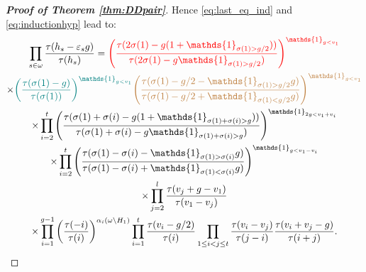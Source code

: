 \documentclass[11pt,letterpaper]{amsart}
\numberwithin{equation}{section}
\numberwithin{df}{section}
\begin{document}
\begin{proof}[\textbf{Proof of Theorem \ref{thm:DDpair}}]
Hence \eqref{eq:last_eq_ind} and \eqref{eq:inductionhyp} lead to:
\begin{multline}\label{eq:last_hope}
\prod_{s\in\omega}\frac{\tau(h_s-\varepsilon_s g)}{\tau(h_s)}=\textcolor{red}{\left(\frac{\tau(2\sigma(1)-g(1+\mathds{1}_{\sigma(1)>g/2}))}{\tau(2\sigma(1)-g\mathds{1}_{\sigma(1)>g/2})}\right)^{\mathds{1}_{g<v_1}}}
\\\times \textcolor{teal}{\left(\frac{\tau(\sigma(1)-g)}{\tau(\sigma(1))}\right)^{\mathds{1}_{g<v_1}}}
\textcolor{brown}{\left(\frac{\tau(\sigma(1)-g/2-\mathds{1}_{\sigma(1)>g/2}g)}{\tau(\sigma(1)-g/2+\mathds{1}_{\sigma(1)<g/2}g)}\right)^{\mathds{1}_{g<v_1}}}
\\ \times
\prod_{i=2}^{t}\left(\frac{\tau(\sigma(1)+\sigma(i)-g(1+\mathds{1}_{\sigma(1)+\sigma(i)>g}))}{\tau(\sigma(1)+\sigma(i)-g\mathds{1}_{\sigma(1)+\sigma(i)>g})}\right)^{\mathds{1}_{2g<v_1+v_i}}\\
\times\prod_{i=2}^{t}\left(\frac{\tau(\sigma(1)-\sigma(i)-\mathds{1}_{\sigma(1)>\sigma(i)}g)}{\tau(\sigma(1)-\sigma(i)+\mathds{1}_{\sigma(1)<\sigma(i)}g)}\right)^{\mathds{1}_{g<v_1-v_i}}\\
\times\prod_{j=2}^l\frac{\tau(v_j+g-v_1)}{\tau(v_1-v_j)}\\ \times
\prod_{i=1}^{g-1}\left(\frac{\tau(-i)}{\tau(i)}\right)^{\alpha_i(\omega\setminus H_1)}\prod_{i=1}^{t}\frac{\tau(v_i-g/2)}{\tau(i)}\prod_{1\leq i<j\leq t} \frac{\tau(v_i-v_j)}{\tau(j-i)} \frac{\tau(v_i+v_j-g)}{\tau(i+j)}.

\end{multline}
\end{proof}
\end{document}
